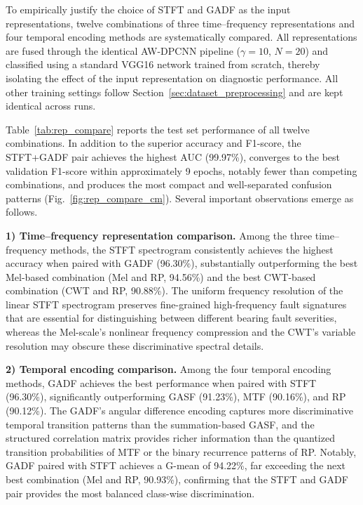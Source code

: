 \documentclass[pdflatex,sn-mathphys-num]{sn-jnl}
\theoremstyle{thmstyleone}%
\theoremstyle{thmstyletwo}%
\theoremstyle{thmstylethree}%
\begin{document}
To empirically justify the choice of STFT and GADF as the input representations, twelve combinations of three time--frequency representations and four temporal encoding methods are systematically compared. All representations are fused through the identical AW-DPCNN pipeline ($\gamma=10$, $N=20$) and classified using a standard VGG16 network trained from scratch, thereby isolating the effect of the input representation on diagnostic performance. All other training settings follow Section~\ref{sec:dataset_preprocessing} and are kept identical across runs.

Table~\ref{tab:rep_compare} reports the test set performance of all twelve combinations. In addition to the superior accuracy and F1-score, the STFT+GADF pair achieves the highest AUC (99.97\%), converges to the best validation F1-score within approximately 9 epochs, notably fewer than competing combinations, and produces the most compact and well-separated confusion patterns (Fig.~\ref{fig:rep_compare_cm}). Several important observations emerge as follows.

\textbf{1) Time--frequency representation comparison.} Among the three time--frequency methods, the STFT spectrogram consistently achieves the highest accuracy when paired with GADF (96.30\%), substantially outperforming the best Mel-based combination (Mel and RP, 94.56\%) and the best CWT-based combination (CWT and RP, 90.88\%). The uniform frequency resolution of the linear STFT spectrogram preserves fine-grained high-frequency fault signatures that are essential for distinguishing between different bearing fault severities, whereas the Mel-scale's nonlinear frequency compression and the CWT's variable resolution may obscure these discriminative spectral details.

\textbf{2) Temporal encoding comparison.} Among the four temporal encoding methods, GADF achieves the best performance when paired with STFT (96.30\%), significantly outperforming GASF (91.23\%), MTF (90.16\%), and RP (90.12\%). The GADF's angular difference encoding captures more discriminative temporal transition patterns than the summation-based GASF, and the structured correlation matrix provides richer information than the quantized transition probabilities of MTF or the binary recurrence patterns of RP. Notably, GADF paired with STFT achieves a G-mean of 94.22\%, far exceeding the next best combination (Mel and RP, 90.93\%), confirming that the STFT and GADF pair provides the most balanced class-wise discrimination.
\end{document}

